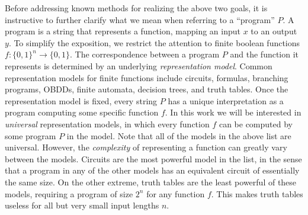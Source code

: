 \documentclass{article}
\begin{document}
%

Before addressing known methods for realizing the above two
goals, it is instructive to further clarify what we mean when
referring to a ``program'' $P$. A program is a string that
represents a function, mapping an input $x$ to an output $y$. To
simplify the exposition, we restrict the attention to finite
boolean functions $f:\{0,1\}^n\to\{0,1\}$. The correspondence
between a program $P$ and the function it represents is
determined by an underlying {\em representation model}. Common
representation models for finite functions include circuits,
formulas, branching programs, OBDDs, finite automata, decision
trees, and truth tables. Once the representation model is fixed,
every string $P$ has a unique interpretation as a program
computing some specific function $f$. In this work we will be
interested in {\em universal} representation models, in which
every function $f$ can be computed by some program $P$ in the
model. Note that all of the models in the above list are
universal.  However, the {\em complexity} of representing a
function can greatly vary between the models.
Circuits are the most powerful model in the list, in the sense
that a program in any of the other models has an equivalent
circuit of essentially the same size. On the other extreme,
truth tables are the least powerful of these models, requiring
a program of size $2^n$ for any function $f$. This makes truth
tables useless for all but very small input lengths $n$.
\end{document}
